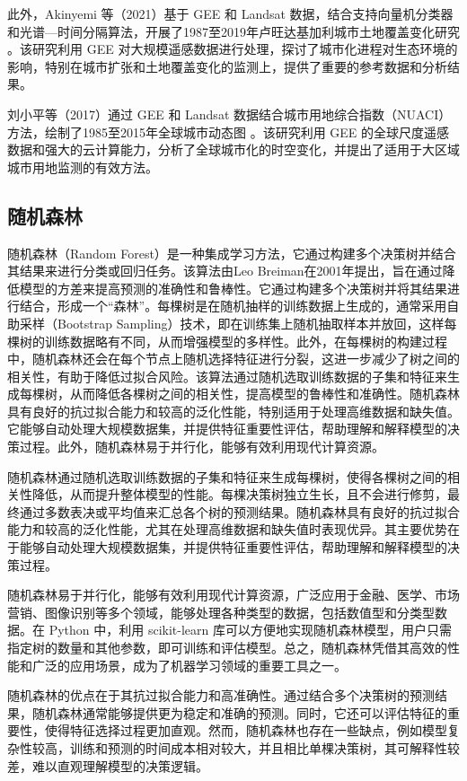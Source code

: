 \documentclass[AutoFakeBold]{LZUThesis-PgD&PhD}
\begin{document}
此外，Akinyemi 等（2021）基于 GEE 和 Landsat 数据，结合支持向量机分类器和光谱—时间分隔算法，开展了1987至2019年卢旺达基加利城市土地覆盖变化研究 \cite{Akinyemi2021}。该研究利用 GEE 对大规模遥感数据进行处理，探讨了城市化进程对生态环境的影响，特别在城市扩张和土地覆盖变化的监测上，提供了重要的参考数据和分析结果。

刘小平等（2017）通过 GEE 和 Landsat 数据结合城市用地综合指数（NUACI）方法，绘制了1985至2015年全球城市动态图 \cite{Liu2017}。该研究利用 GEE 的全球尺度遥感数据和强大的云计算能力，分析了全球城市化的时空变化，并提出了适用于大区域城市用地监测的有效方法。

    \subsection{随机森林}

    随机森林（Random Forest）是一种集成学习方法，它通过构建多个决策树并结合其结果来进行分类或回归任务。该算法由Leo Breiman在2001年提出，旨在通过降低模型的方差来提高预测的准确性和鲁棒性。它通过构建多个决策树并将其结果进行结合，形成一个“森林”。每棵树是在随机抽样的训练数据上生成的，通常采用自助采样（Bootstrap Sampling）技术，即在训练集上随机抽取样本并放回，这样每棵树的训练数据略有不同，从而增强模型的多样性。此外，在每棵树的构建过程中，随机森林还会在每个节点上随机选择特征进行分裂，这进一步减少了树之间的相关性，有助于降低过拟合风险。该算法通过随机选取训练数据的子集和特征来生成每棵树，从而降低各棵树之间的相关性，提高模型的鲁棒性和准确性。随机森林具有良好的抗过拟合能力和较高的泛化性能，特别适用于处理高维数据和缺失值。它能够自动处理大规模数据集，并提供特征重要性评估，帮助理解和解释模型的决策过程。此外，随机森林易于并行化，能够有效利用现代计算资源。

    随机森林通过随机选取训练数据的子集和特征来生成每棵树，使得各棵树之间的相关性降低，从而提升整体模型的性能。每棵决策树独立生长，且不会进行修剪，最终通过多数表决或平均值来汇总各个树的预测结果。随机森林具有良好的抗过拟合能力和较高的泛化性能，尤其在处理高维数据和缺失值时表现优异。其主要优势在于能够自动处理大规模数据集，并提供特征重要性评估，帮助理解和解释模型的决策过程。

    随机森林易于并行化，能够有效利用现代计算资源，广泛应用于金融、医学、市场营销、图像识别等多个领域，能够处理各种类型的数据，包括数值型和分类型数据。在 Python 中，利用 scikit-learn 库可以方便地实现随机森林模型，用户只需指定树的数量和其他参数，即可训练和评估模型。总之，随机森林凭借其高效的性能和广泛的应用场景，成为了机器学习领域的重要工具之一。

    随机森林的优点在于其抗过拟合能力和高准确性。通过结合多个决策树的预测结果，随机森林通常能够提供更为稳定和准确的预测。同时，它还可以评估特征的重要性，使得特征选择过程更加直观。然而，随机森林也存在一些缺点，例如模型复杂性较高，训练和预测的时间成本相对较大，并且相比单棵决策树，其可解释性较差，难以直观理解模型的决策逻辑。
\end{document}
